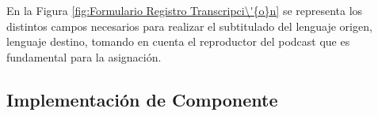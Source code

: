 En la Figura \ref{fig:Formulario Registro Transcripci\'{o}n} se representa los 
distintos campos necesarios para realizar el subtitulado del lenguaje origen, 
lenguaje destino, tomando en cuenta el reproductor del podcast que es fundamental
para la asignaci\'{o}n.

\begin{minipage}{1.0\textwidth}
	\centering
	\label{fig:Formulario Registro Transcripci\'{o}n}
\end{minipage}

\subsection{Implementaci\'{o}n de Componente}

